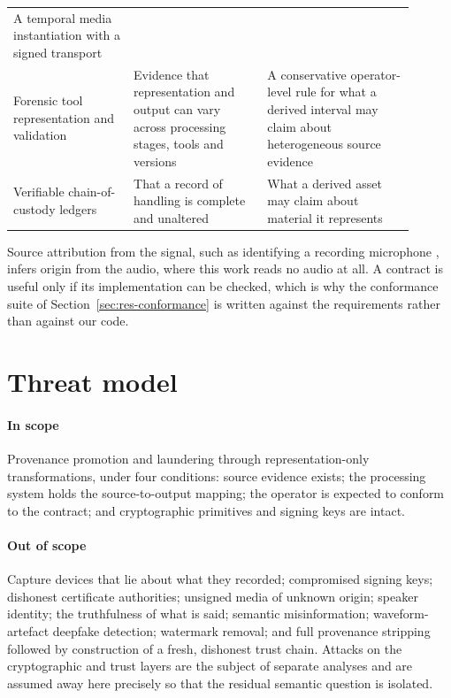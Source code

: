 \documentclass[preprint,3p,11pt,authoryear]{elsarticle}
\begin{document}
\begin{table}[t]
\begin{tabular}{p{0.27\linewidth}p{0.30\linewidth}p{0.33\linewidth}}
A temporal media instantiation with a signed transport \\
\addlinespace
Forensic tool representation and validation
\citep{hargreaves2024abstract,andersen2025toolbias,nordvik2022exfat,kuelper2026testdriven} &
Evidence that representation and output can vary across processing stages,
tools and versions &
A conservative operator-level rule for what a derived interval may claim about
heterogeneous source evidence \\
\addlinespace
Verifiable chain-of-custody ledgers \citep{burri2020custody} &
That a record of handling is complete and unaltered &
What a derived asset may claim about material it represents \\
\bottomrule
\end{tabular}
\end{table}

Source attribution from the signal, such as identifying a recording
microphone \citep{qamhan2023microphone}, infers origin from the audio, where
this work reads no audio at all. A contract is useful only if its
implementation can be checked, which is why the conformance suite of
Section~\ref{sec:res-conformance} is written against the requirements rather
than against our code.

\section{Threat model}
\label{sec:threat}

\paragraph{In scope} Provenance promotion and laundering through
representation-only transformations, under four conditions: source evidence
exists; the processing system holds the source-to-output mapping; the operator
is expected to conform to the contract; and cryptographic primitives and signing
keys are intact.

\paragraph{Out of scope} Capture devices that lie about what they recorded;
compromised signing keys; dishonest certificate authorities; unsigned media of
unknown origin; speaker identity; the truthfulness of what is said; semantic
misinformation; waveform-artefact deepfake detection; watermark removal; and
full provenance stripping followed by construction of a fresh, dishonest trust
chain. Attacks on the cryptographic and trust layers are the subject of separate
analyses \citep{golaszewski2026c2pa} and are assumed away here precisely so that
the residual semantic question is isolated.
\end{document}
